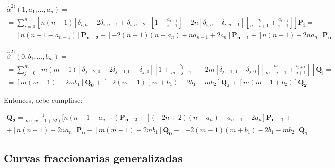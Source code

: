 \documentclass{article}
\begin{document}
\begin{gather*}
\hat{\alpha}^{2)}(1,a_1,...,a_n) = \\
= \sum_{i = 0}^n \left[ n(n-1)\left[ \delta_{i,n} -2\delta_{i,n-1} + \delta_{i,n-2} \right]\left[  1-\frac{a_{i+1}}{i+1}\right] -2n\left[\delta_{i,n} -\delta_{i,n-1} \right] \left[\frac{a_i}{n-i+1} + \frac{a_{i+1}}{i+1} \right] \right] \mathbf{P_i} = \\
= \left[n(n-1-a_{n-1}) \right]\mathbf{P_{n-2}} + \left[-2(n-1)(n-a_n) + na_{n-1} + 2a_n \right]\mathbf{P_{n-1}} + \left[ n(n-1) -2na_n \right]\mathbf{P_n}
\end{gather*}

\begin{gather*}
\hat{\beta}^{2)}(0,b_1,...,b_m) = \\
= \sum_{j = 0}^m \left[ m(m-1)\left[ \delta_{j-2,0} -2\delta_{j-1,0} + \delta_{j,0} \right]\left[  1+\frac{b_j}{m-j+1}\right] -2m\left[\delta_{j-1,0} -\delta_{j,0} \right] \left[\frac{b_j}{m-j+1} + \frac{b_{j+1}}{j+1} \right] \right] \mathbf{Q_j} = \\
= \left[ m(m-1) +2mb_1 \right]\mathbf{Q_0} + \left[ -2(m-1)(m+b_1) -2b_1 -mb_2 \right]\mathbf{Q_1} + \left[ m(m-1+b_2) \right]\mathbf{Q_2}
\end{gather*}

Entonces, debe cumplirse:

\begin{gather*}
\mathbf{Q_2} = \frac{1}{m(m-1+b2)} [ n(n-1-a_{n-1})\mathbf{P_{n-2}} + \left[ (-2n+2)(n-a_n) + a_{n-1} + 2a_n \right]\mathbf{P_{n-1}} + \\
+ \left[n(n-1) -2na_n \right]\mathbf{P_n} - \left[ m(m-1) + 2mb_1 \right]\mathbf{Q_0} -\left[ -2(m-1)(m+b_1) -2b_1 -mb_2 \right]\mathbf{Q_1} ]
\end{gather*}



\subsection{Curvas fraccionarias generalizadas}
\end{document}
